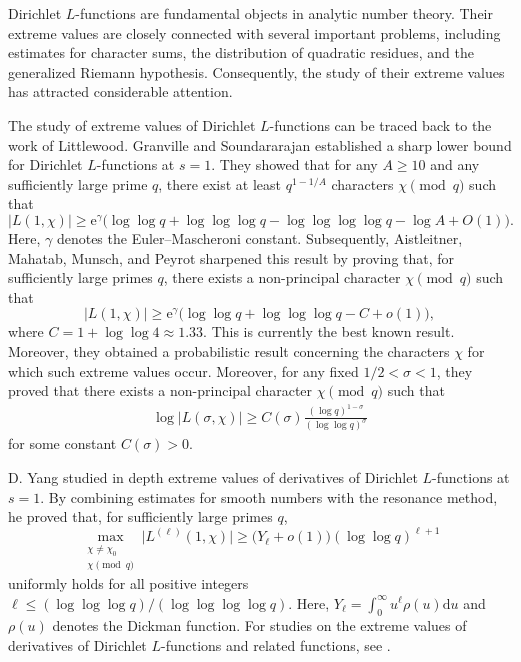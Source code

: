 \documentclass[12pt,reqno]{amsart}
\theoremstyle{definition}
\numberwithin{equation}{section}
\newcommand{\bg}{\big}
\newcommand{\mmd}{\mathrm{d}}
\newcommand{\mme}{\mathrm{e}}
\begin{document}
Dirichlet \(L\)-functions are fundamental objects in analytic number theory. Their extreme values are closely connected with several important problems, including estimates for character sums, the distribution of quadratic residues, and the generalized Riemann hypothesis. Consequently, the study of their extreme values has attracted considerable attention.
\par
The study of extreme values of Dirichlet \(L\)-functions can be traced back to the work of Littlewood. Granville and Soundararajan \cite{Granville2006Ramanujan} established a sharp lower bound for Dirichlet \(L\)-functions at \(s=1\). They showed that for any \(A \ge 10\) and any sufficiently large prime \(q\), there exist at least \(q^{1-1/A}\) characters \(\chi \pmod{q}\) such that
\[
|L(1,\chi)| \ge \mme^\gamma\bg(\log\log q+\log\log\log q-\log\log\log\log q-\log A+O(1)\bg).
\]
Here, \(\gamma\) denotes the Euler–Mascheroni constant. Subsequently, Aistleitner, Mahatab, Munsch, and Peyrot \cite{Aistleitner2019QJMath} sharpened this result by proving that, for sufficiently large primes \(q\), there exists a non-principal character \(\chi \pmod q\) such that
\[
    |L(1,\chi)| \ge \mme^\gamma\bg(\log\log q+\log\log\log q-C+o(1)\bg),
\]
where \(C=1+\log\log 4 \approx 1.33\). This is currently the best known result. Moreover, they obtained a probabilistic result concerning the characters \(\chi\) for which such extreme values occur. Moreover, for any fixed \(1/2<\sigma<1\), they proved that there exists a non-principal character \(\chi \pmod q\) such that 
\begin{align}\label{ammp}
    \log |L(\sigma,\chi)| \ge C(\sigma)\frac{(\log q)^{1-\sigma}}{(\log\log q)^{\sigma}}
\end{align}
for some constant \(C(\sigma)>0\).
\par
D. Yang \cite{yang2024BLMS} studied in depth extreme values of derivatives of Dirichlet \(L\)-functions at \(s=1\). By combining estimates for smooth numbers with the resonance method, he proved that, for sufficiently large primes \(q\), 
\[
\max_{\substack{\chi \neq \chi_0 \\ \chi \pmod q}} \bg|L^{(\ell)}(1,\chi) \bg| \ge \bg(Y_\ell+o(1)\bg) (\log\log q)^{\ell+1}
\]
uniformly holds for all positive integers \(\ell \le (\log\log\log q)/(\log\log\log\log q)\). Here, \(Y_\ell = \int_0^\infty u^\ell \rho(u)\mmd u\) and \(\rho(u)\) denotes the Dickman function. For studies on the extreme values of derivatives of Dirichlet \(L\)-functions and related functions, see \cite{dong2023BAustMS,dong2023Onde,yang2022extreme,YANG2026jmaa}.
\end{document}
